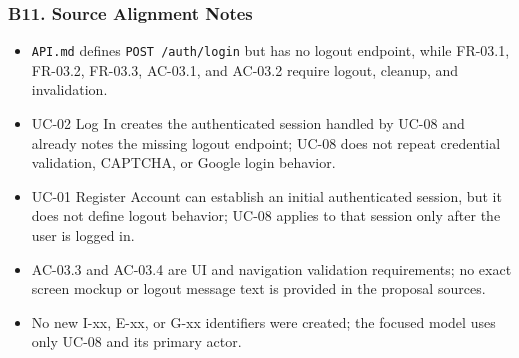 \documentclass[12pt]{article}
\begin{document}
\hypertarget{sec:b11-source-alignment-notes}{}
\subsubsection*{B11. Source Alignment Notes}
\par\medskip

\begin{itemize}
\item \texttt{API.md} defines \texttt{POST /auth/login} but has no logout endpoint, while FR-03.1, FR-03.2, FR-03.3, AC-03.1, and AC-03.2 require logout, cleanup, and invalidation.
\item UC-02 Log In creates the authenticated session handled by UC-08 and already notes the missing logout endpoint; UC-08 does not repeat credential validation, CAPTCHA, or Google login behavior.
\item UC-01 Register Account can establish an initial authenticated session, but it does not define logout behavior; UC-08 applies to that session only after the user is logged in.
\item AC-03.3 and AC-03.4 are UI and navigation validation requirements; no exact screen mockup or logout message text is provided in the proposal sources.
\item No new I-xx, E-xx, or G-xx identifiers were created; the focused model uses only UC-08 and its primary actor.
\end{itemize}
\par\medskip
\end{document}
